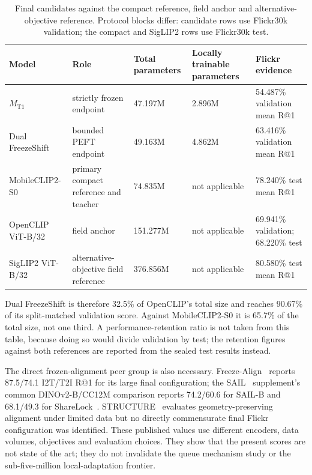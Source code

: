 \documentclass[11pt,a4paper,oneside]{report}
\newcommand{\MTone}{\ensuremath{M_{\mathrm{T1}}}}
\begin{document}
\begin{table}[htbp]
\centering
\caption{Final candidates against the compact reference, field anchor and alternative-objective reference. Protocol blocks differ: candidate rows use Flickr30k validation; the compact and SigLIP2 rows use Flickr30k test.}
\label{tab:references}
\small
\begin{tabular}{L{2.1cm}L{2.9cm}R{1.9cm}R{2.3cm}L{3.3cm}}
\toprule
Model & Role & Total parameters & Locally trainable parameters & Flickr evidence \\
\midrule
\MTone{} & strictly frozen endpoint & 47.197M & 2.896M & 54.487\% validation mean R@1 \\
Dual FreezeShift & bounded PEFT endpoint & 49.163M & 4.862M & 63.416\% validation mean R@1 \\
MobileCLIP2-S0 & primary compact reference and teacher & 74.835M & not applicable & 78.240\% test mean R@1 \\
OpenCLIP ViT-B/32 & field anchor & 151.277M & not applicable & 69.941\% validation; 68.220\% test \\
SigLIP2 ViT-B/32 & alternative-objective field reference & 376.856M & not applicable & 80.580\% test mean R@1 \\
\bottomrule
\end{tabular}
\end{table}
Dual FreezeShift is therefore 32.5\% of OpenCLIP's total size and reaches 90.67\% of its split-matched validation score. Against MobileCLIP2-S0 it is 65.7\% of the total size, not one third. A performance-retention ratio is not taken from this table, because doing so would divide validation by test; the retention figures against both references are reported from the sealed test results instead.

The direct frozen-alignment peer group is also necessary. Freeze-Align~\cite{maniparambil2025freezealign} reports 87.5/74.1 I2T/T2I R@1 for its large final configuration; the SAIL~\cite{zhang2025sail} supplement's common DINOv2-B/CC12M comparison reports 74.2/60.6 for SAIL-B and 68.1/49.3 for ShareLock~\cite{ruthardt2026sharelock}. STRUCTURE~\cite{groger2025structure} evaluates geometry-preserving alignment under limited data but no directly commensurate final Flickr configuration was identified. These published values use different encoders, data volumes, objectives and evaluation choices. They show that the present scores are not state of the art; they do not invalidate the queue mechanism study or the sub-five-million local-adaptation frontier.
\end{document}
